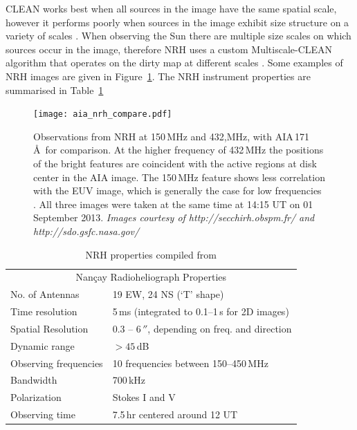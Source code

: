 CLEAN works best when all sources in the image have the same spatial scale, however it performs poorly when sources in the image exhibit size structure on a variety of scales \citep{wakker1998}. When observing the Sun there are multiple size scales on which sources occur in the image, therefore NRH uses a custom Multiscale-CLEAN algorithm that operates on the dirty map at different scales \citep{mercier2006}. Some examples of NRH images are given in Figure~\ref{fig:nrh_obs}. The NRH instrument properties are summarised in Table~\ref{tab:nrh}


\begin{figure}[!t]
\begin{center}
\texttt{[image: aia\_nrh\_compare.pdf]}
\caption[NRH observations]{Observations from NRH at 150\,MHz and 432,MHz, with AIA\,171\,\AA~for comparison. {\color{blue}At the higher frequency of 432\,MHz the positions of the bright features are coincident with the active regions at disk center in the AIA image. The 150\,MHz feature shows less correlation with the EUV image, which is generally the case for low frequencies \citep{mercier2009}.} All three images were taken at the same time at 14:15 UT on 01 September 2013. \emph{Images courtesy of http://secchirh.obspm.fr/ and http://sdo.gsfc.nasa.gov/}}
\label{fig:nrh_obs}
\end{center}
\end{figure}
\begin{table}[!t]
  \centering
\begin{tabular}{ll}
\hline
\multicolumn{2}{c}{Nan\c{c}ay Radioheliograph Properties} \\
\cline{1-2}
No. of Antennas		    & 19 EW, 24 NS (`T' shape) \\
Time resolution             & 5\,ms (integrated to 0.1--1\,s for 2D images) \\
Spatial Resolution        & 0.3 -- 6\,$''$, depending on freq. and direction \\
Dynamic range   		    & $>45$\,dB \\
Observing frequencies & 10 frequencies between 150--450\,MHz \\
Bandwidth                    & 700\,kHz \\
Polarization                  & Stokes I and V \\
Observing time             & 7.5\,hr centered around 12 UT \\
\hline

\end{tabular}
\caption {NRH properties compiled from \citep{kerdraon1997}}
\label{tab:nrh}
\end{table}

